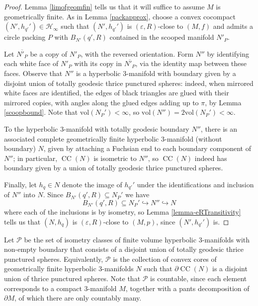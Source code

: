 \documentclass[11pt,leqno]{article}
\DeclareMathOperator{\CC}{CC}
\theoremstyle{introdef}
\numberwithin{lemma}{section}
\theoremstyle{definition}
\begin{document}
    
\begin{proof}
    Lemma \ref{limofgeomfin} tells us that it will suffice to assume $M$ is geometrically finite. As in Lemma \ref{packapprox}, choose a convex cocompact $(N',h_{q'}')\in\mathcal{H}_\infty$ such that $(N',h_{q'}')$ is $(\varepsilon,R)$-close to $(M,f)$ and admits a circle packing $P$ with $B_{N'}(q',R)$ contained in the scooped manifold $N'_{P}$. \par

    Let $\overline{N'_P}$ be a copy of $N'_P$, with the reversed orientation. Form $N''$ by identifying each white face of $N'_P$ with its copy in $\overline{N'_P}$, via the identity map between these faces. Observe that $N''$ is a hyperbolic $3$-manifold with boundary given by a disjoint union of totally geodesic thrice punctured spheres: indeed, when mirrored white faces are identified, the edges of  black triangles are glued with their mirrored copies, with angles along the glued edges adding up to $\pi$, by Lemma \ref{scoopbound}. Note that $\mathrm{vol}(N_P')<\infty$, so $\mathrm{vol}(N'')=2\mathrm{vol}(N_P')<\infty$. \par

    To the hyperbolic $3$-manifold with totally geodesic boundary $N''$, there is an associated complete geometrically finite hyperbolic $3$-manifold (without boundary) $N$, given by attaching a Fuchsian end to each boundary component of $N''$; in particular, $\CC(N)$ is isometric to $N''$, so $\CC(N)$ indeed has boundary given by a union of totally geodesic thrice punctured spheres.\par

    Finally, let $h_q\in N$ denote the image of $h_{q'}'$ under the identifications and inclusion of $N''$ into $N$. Since $B_{N'}(q',R)\subseteq N_P'$ we have \[B_{N'}(q',R)\subseteq N_P'\hookrightarrow N''\hookrightarrow N\] where each of the inclusions is by isometry, so Lemma \ref{lemma-eRTransitivity} tells us that $(N,h_q)$ is $(\varepsilon,R)$-close to $(M,p)$, since $(N',h_{q'}')$ is.
\end{proof}

 Let $\mathcal{P}$ be the set of isometry classes of finite volume hyperbolic $3$-manifolds with non-empty boundary that consists of a disjoint union of totally geodesic thrice punctured spheres. Equivalently, $\mathcal{P}$ is the collection of convex cores of geometrically finite hyperbolic $3$-manifolds $N$ such that $\partial \CC(N)$ is a disjoint union of thrice punctured spheres. Note that $\mathcal{P}$ is countable, since each element corresponds to a compact $3$-manifold $M$, together with a pants decomposition of $\partial M$, of which there are only countably many.\par
\end{document}
